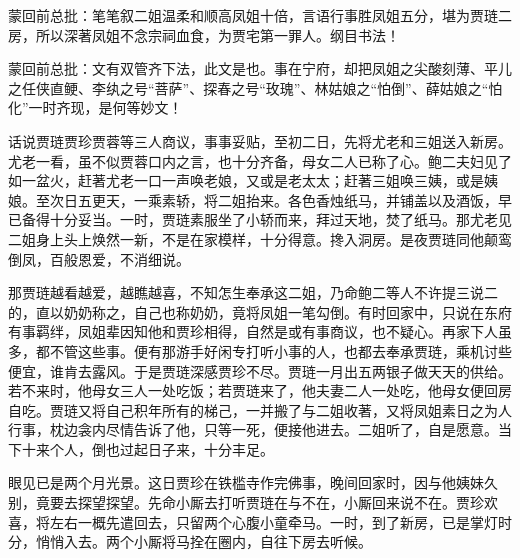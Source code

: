 \begin{parag}

    \begin{note}蒙回前总批：笔笔叙二姐温柔和顺高凤姐十倍，言语行事胜凤姐五分，堪为贾琏二房，所以深著凤姐不念宗祠血食，为贾宅第一罪人。纲目书法！\end{note}
\end{parag}


\begin{parag}


    \begin{note}蒙回前总批：文有双管齐下法，此文是也。事在宁府，却把凤姐之尖酸刻薄、平儿之任侠直鲠、李纨之号“菩萨”、探春之号“玫瑰”、林姑娘之“怕倒”、薛姑娘之“怕化”一时齐现，是何等妙文！\end{note}
\end{parag}

\begin{parag}

    话说贾琏贾珍贾蓉等三人商议，事事妥贴，至初二日，先将尤老和三姐送入新房。尤老一看，虽不似贾蓉口内之言，也十分齐备，母女二人已称了心。鲍二夫妇见了如一盆火，赶著尤老一口一声唤老娘，又或是老太太；赶著三姐唤三姨，或是姨娘。至次日五更天，一乘素轿，将二姐抬来。各色香烛纸马，并铺盖以及酒饭，早已备得十分妥当。一时，贾琏素服坐了小轿而来，拜过天地，焚了纸马。那尤老见二姐身上头上焕然一新，不是在家模样，十分得意。搀入洞房。是夜贾琏同他颠鸾倒凤，百般恩爱，不消细说。
\end{parag}


\begin{parag}


    那贾琏越看越爱，越瞧越喜，不知怎生奉承这二姐，乃命鲍二等人不许提三说二的，直以奶奶称之，自己也称奶奶，竟将凤姐一笔勾倒。有时回家中，只说在东府有事羁绊，凤姐辈因知他和贾珍相得，自然是或有事商议，也不疑心。再家下人虽多，都不管这些事。便有那游手好闲专打听小事的人，也都去奉承贾琏，乘机讨些便宜，谁肯去露风。于是贾琏深感贾珍不尽。贾琏一月出五两银子做天天的供给。若不来时，他母女三人一处吃饭；若贾琏来了，他夫妻二人一处吃，他母女便回房自吃。贾琏又将自己积年所有的梯己，一并搬了与二姐收著，又将凤姐素日之为人行事，枕边衾内尽情告诉了他，只等一死，便接他进去。二姐听了，自是愿意。当下十来个人，倒也过起日子来，十分丰足。
\end{parag}


\begin{parag}


    眼见已是两个月光景。这日贾珍在铁槛寺作完佛事，晚间回家时，因与他姨妹久别，竟要去探望探望。先命小厮去打听贾琏在与不在，小厮回来说不在。贾珍欢喜，将左右一概先遣回去，只留两个心腹小童牵马。一时，到了新房，已是掌灯时分，悄悄入去。两个小厮将马拴在圈内，自往下房去听候。
\end{parag}


